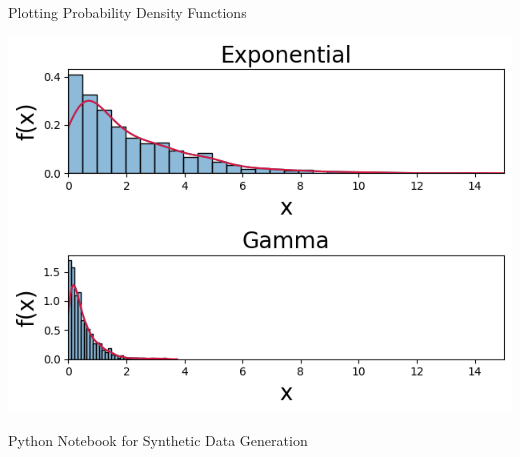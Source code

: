 \documentclass[aspectratio=169,xcolor=dvipsnames,svgnames,x11names,fleqn]{beamer}
\begin{document}
    \begin{frame}[containsverbatim]{Plotting Probability Density Functions}
    \begin{center}
        \includegraphics[height=.6\textheight]{figures/PDFs.png}
    
    \end{center}
    \end{frame}
    
    
    \begin{frame}[containsverbatim]{Python Notebook for Synthetic Data Generation}
    \begin{center}
    \small
    { }
    
    \end{center}
    \end{frame}
    
\end{document}
